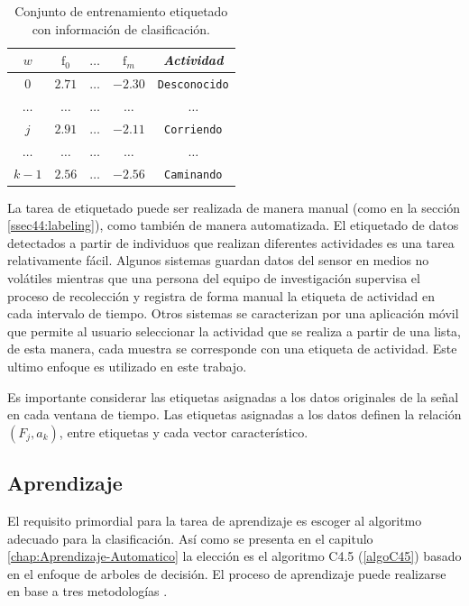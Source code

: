 \begin{table}[!tbph]
\begin{centering}
\begin{tabular}{|c|c|c|c|c|}
\hline 
$w$ & $\mathrm{f}_{0}$ & $\ldots$ & $\mathrm{f}_{m}$ & \emph{Actividad}\tabularnewline
\hline 
\hline 
$0$ & $2.71$ & \texttt{$\ldots$} & \texttt{$-2.30$} & \texttt{\small{}Desconocido}\tabularnewline
\hline 
$\ldots$ & $\ldots$ & \texttt{$\ldots$} & \texttt{$\ldots$} & \texttt{$\ldots$}\tabularnewline
\hline 
$j$ & $2.91$ & \texttt{$\ldots$} & \texttt{$-2.11$} & \texttt{\small{}Corriendo}\tabularnewline
\hline 
$\ldots$ & $\ldots$ & \texttt{$\ldots$} & \texttt{$\ldots$} & \texttt{$\ldots$}\tabularnewline
\hline 
$k-1$ & $2.56$ & \texttt{$\ldots$} & \texttt{$-2.56$} & \texttt{\small{}Caminando}\tabularnewline
\hline 
\end{tabular}
\par\end{centering}
\caption[Instancias etiquetadas]{\label{tab4:labeled}Conjunto de entrenamiento etiquetado con información
de clasificación.}
\end{table}

La tarea de etiquetado puede ser realizada de manera manual (como
en la sección \ref{ssec44:labeling}), como también de manera automatizada.
El etiquetado de datos detectados a partir de individuos que realizan
diferentes actividades es una tarea relativamente fácil. Algunos sistemas
guardan datos del sensor en medios no volátiles mientras que una persona
del equipo de investigación supervisa el proceso de recolección y
registra de forma manual la etiqueta de actividad en cada intervalo
de tiempo. Otros sistemas se caracterizan por una aplicación móvil
que permite al usuario seleccionar la actividad que se realiza a partir
de una lista, de esta manera, cada muestra se corresponde con una
etiqueta de actividad. Este ultimo enfoque es utilizado en este trabajo.

Es importante considerar las etiquetas asignadas a los datos originales
de la señal en cada ventana de tiempo. Las etiquetas asignadas a los
datos definen la relación $(F_{j},a_{k})$, entre etiquetas y cada
vector característico. 

\subsection{Aprendizaje}

El requisito primordial para la tarea de aprendizaje es escoger al
algoritmo adecuado para la clasificación. Así como se presenta en
el capitulo \ref{chap:Aprendizaje-Automatico} la elección es el algoritmo
C4.5 (\ref{algoC45}) basado en el enfoque de arboles de decisión.
El proceso de aprendizaje puede realizarse en base a tres metodologías
\cite{Rajaraman2011}.

